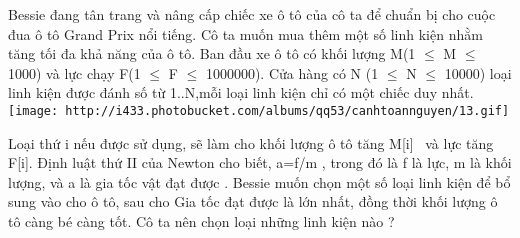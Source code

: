 Bessie đang tân trang và nâng cấp chiếc xe ô tô của cô ta để chuẩn bị cho cuộc đua ô tô Grand Prix nổi tiếng. Cô ta muốn mua thêm một số linh kiện nhằm tăng tối đa khả năng của ô tô. Ban đầu xe ô tô có khối lượng M(1 $\le$  M  $\le$ 1000) và lực chạy F(1 $\le$  F  $\le$ 1000000). Cửa hàng có N (1 $\le$  N  $\le$ 10000) loại linh kiện được đánh số từ 1..N,mỗi loại linh kiện chỉ có một chiếc duy nhất.   
\texttt{[image: http://i433.photobucket.com/albums/qq53/canhtoannguyen/13.gif]}

   Loại thứ i nếu được sử dụng, sẽ làm cho khối lượng ô tô tăng M[i]  và lực tăng F[i]. Định luật thứ II của Newton cho biết, a=f/m , trong đó là f là lực, m là khối lượng, và a là gia tốc vật đạt được . Bessie muốn chọn một số loại linh kiện để bổ sung vào cho ô tô, sau cho Gia tốc đạt được là lớn nhất, đồng thời khối lượng ô tô càng bé càng tốt. Cô ta nên chọn loại những linh kiện nào ?